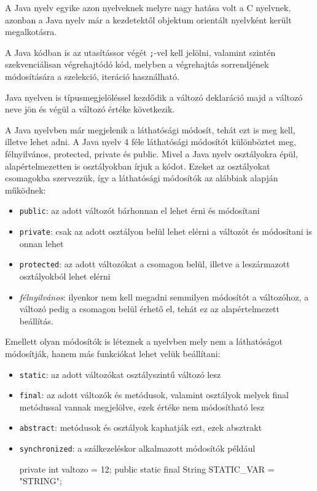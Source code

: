 A Java nyelv egyike azon nyelveknek melyre nagy hatása volt a C nyelvnek, azonban a Java nyelv már a kezdetektől objektum orientált nyelvként került megalkotásra.

A Java kódban is az utasítássor végét \texttt{;}-vel kell jelölni, valamint szintén szekvenciálisan végrehajtódó kód, melyben a végrehajtás sorrendjének módosítására a szelekció, iteráció használható.

Java nyelven is típusmegjelöléssel kezdődik a változó deklaráció majd a változó neve jön és végül a változó értéke következik.

A Java nyelvben már megjelenik a láthatósági módosít, tehát ezt is meg kell, illetve lehet adni. A Java nyelv 4 féle láthatósági módosítót különböztet meg, félnyilvános, protected, private és public. Mivel a Java nyelv osztályokra épül, alapértelmezetten is osztályokban írjuk a kódot. Ezeket az osztályokat csomagokba szervezzük, így a láthatósági módosítók az alábbiak alapján működnek:
\begin{itemize}
\item \texttt{public}: az adott változót bárhonnan el lehet érni és módosítani
\item \texttt{private}: csak az adott osztályon belül lehet elérni a változót és módosítani is onnan lehet
\item \texttt{protected}: az adott változókat a csomagon belül, illetve a leszármazott osztályokból lehet elérni
\item \textit{félnyilvános}: ilyenkor nem kell megadni semmilyen módosítót a változóhoz, a változó pedig a csomagon belül érhető el, tehát ez az alapértelmezett beállítás.
\end{itemize}

Emellett olyan módosítók is léteznek a nyelvben mely nem a láthatóságot módosítják, hanem más funkciókat lehet velük beállítani:
\begin{itemize}
\item \texttt{static}: az adott változókat osztályszintű változó lesz
\item \texttt{final}: az adott változók és metódusok, valamint osztályok melyek final metódussal vannak megjelölve, ezek értéke nem módosítható lesz
\item \texttt{abstract}: metódusok és osztályok kaphatják ezt, ezek absztrakt
\item \texttt{synchronized}: a szálkezeléskor alkalmazott módosítók
például
\begin{java}
private int valtozo = 12;
public static final String STATIC_VAR = "STRING";
\end{java}
\end{itemize}

